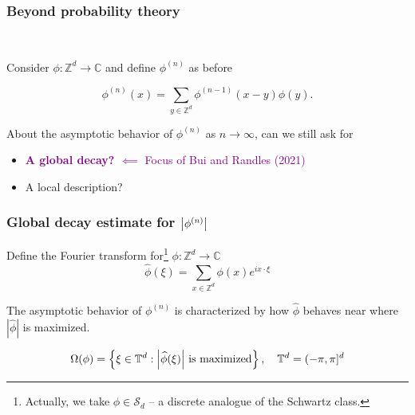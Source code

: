 \documentclass{beamer}
\theoremstyle{definition}
\begin{document}


\begin{frame}
\frametitle{Beyond probability theory}
\begin{center}
	\textcolor{blue}{}\\
\end{center}



Consider $\phi: \mathbb{Z}^d \to \mathbb{C}$ and define $\phi^{(n)}$ as before

\begin{equation*}
\phi^{(n)}(x)=\sum_{y\in\mathbb{Z}^d}\phi^{(n-1)}(x-y)\phi(y).
\end{equation*}

%


About the asymptotic behavior of $\phi^{(n)}$ as $n\to \infty$, can we still ask for
\begin{itemize}
	\item \textcolor{purple}{\textbf{A global decay? $\impliedby$} Focus of Bui and Randles (2021)} 
	\item A local description?
\end{itemize}


\end{frame}







\begin{frame}
\frametitle{Global decay estimate for $\abs{\phi^{(n)}}$}


Define the Fourier transform for\footnote{\tiny{Actually, we take $\phi\in \mathcal{S}_d$ -- a discrete analogue of the Schwartz class.}} $\phi: \mathbb{Z}^d \to \mathbb{C}$
\begin{equation*}
\widehat{\phi}(\xi)=\sum_{x\in\mathbb{Z}^d}\phi(x)e^{ix\cdot\xi}
\end{equation*}

\textcolor{purple}{
\begin{center}
\end{center}}



The asymptotic behavior of $\phi^{(n)}$ is characterized by how $\widehat{\phi}$ behaves near where $|\widehat{\phi}|$ is maximized.

\begin{equation*}
\Omega(\phi)=\left\{\xi\in \mathbb{T}^d:\abs{\widehat{\phi}(\xi)} \text{ is maximized}\right\}, \quad \mathbb{T}^d=(-\pi,\pi]^d
\end{equation*}
\end{frame}
\end{document}
